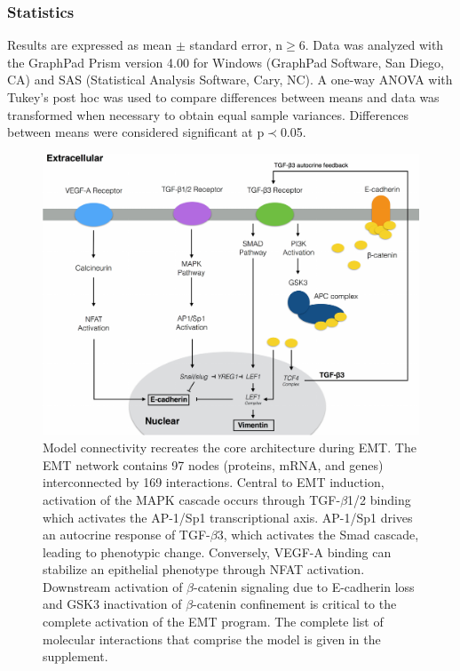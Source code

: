 \documentclass[11pt,letterpaper]{article}
\begin{document}
\subsubsection*{Statistics}
Results are expressed as mean $\pm$ standard error, n$\geq$6. Data was analyzed with the GraphPad Prism version 4.00 for Windows (GraphPad Software, San Diego, CA) and SAS (Statistical Analysis Software, Cary, NC). A one-way ANOVA with Tukey's post hoc was used to compare differences between means and data was transformed when necessary to obtain equal sample variances. Differences between means were considered significant at p$\prec$0.05.

\clearpage




\clearpage

\begin{figure}
\includegraphics [width=1.0\linewidth] {./figs/Fig1_coarse_network.pdf}
\caption{Model connectivity recreates the core architecture during EMT. The EMT network contains 97 nodes (proteins, mRNA, and genes) interconnected by 169 interactions.
Central to EMT induction, activation of the MAPK cascade occurs through TGF-$\beta$1/2 binding which activates the AP-1/Sp1 transcriptional axis. AP-1/Sp1 drives an autocrine response of TGF-$\beta$3, which activates the Smad cascade, leading to phenotypic change. Conversely, VEGF-A binding can stabilize an epithelial phenotype through NFAT activation.
Downstream activation of $\beta$-catenin signaling due to E-cadherin loss and GSK3 inactivation of $\beta$-catenin confinement is critical to the complete activation of the EMT program.
The complete list of molecular interactions that comprise the model is given in the supplement.}\label{fg:F1}
\end{figure}
\end{document}
